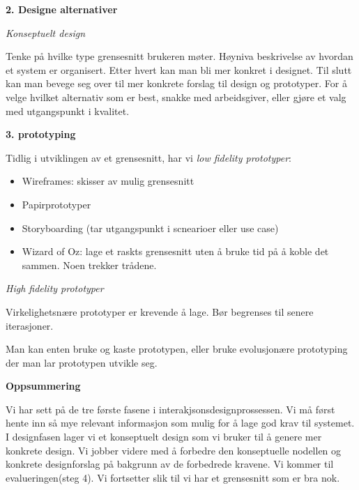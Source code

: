 \documentclass{article}
\begin{document}
\begin{flushleft}
\textbf{2. Designe alternativer}\par 
\emph{Konseptuelt design} \par 
Tenke på hvilke type grensesnitt brukeren møter. 
Høyniva beskrivelse av hvordan et system er organisert.
Etter hvert kan man bli mer konkret i designet. 
Til slutt kan man bevege seg over til mer konkrete forslag til design og prototyper.
For å velge hvilket alternativ som er best, snakke med arbeidsgiver, eller gjøre et valg med utgangspunkt i kvalitet. 
\bigskip

\textbf{3. prototyping}\par 
Tidlig i utviklingen av et grensesnitt, har vi \emph{low fidelity prototyper}:
\begin{itemize}
    \item Wireframes: skisser av mulig grensesnitt
    \item Papirprototyper
    \item Storyboarding (tar utgangspunkt i scnearioer eller use case)
    \item Wizard of Oz: lage et raskts grensesnitt uten å bruke tid på å koble det sammen. Noen trekker trådene.
\end{itemize} 

\emph{High fidelity prototyper}\par 
Virkelighetsnære prototyper er krevende å lage. Bør begrenses til senere iterasjoner. 

Man kan enten bruke og kaste prototypen, eller bruke evolusjonære prototyping der man lar prototypen utvikle seg.\par
\bigskip 
\textbf{Oppsummering}\par 
Vi har sett på de tre første fasene i interakjsonsdesignprossessen. 
Vi må først hente inn så mye relevant informasjon som mulig for å lage god krav til systemet. 
I designfasen lager vi et konseptuelt design som vi bruker til å genere mer konkrete design. 
Vi jobber videre med å forbedre den konseptuelle nodellen og konkrete designforslag på bakgrunn av de forbedrede kravene. 
Vi kommer til evalueringen(steg 4).
Vi fortsetter slik til vi har et grensesnitt som er bra nok.


\end{flushleft}
\end{document}

